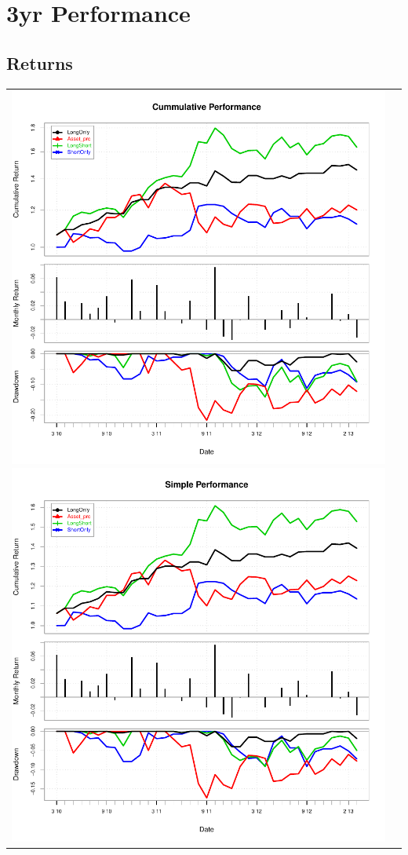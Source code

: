 \documentclass{article}
\begin{document}
\section{3yr Performance}
\subsection{Returns}
\begin{tabular}{cc}
\includegraphics{graphics/plot-010}
\includegraphics{graphics/plot-011}
\end{tabular}
\end{document}
